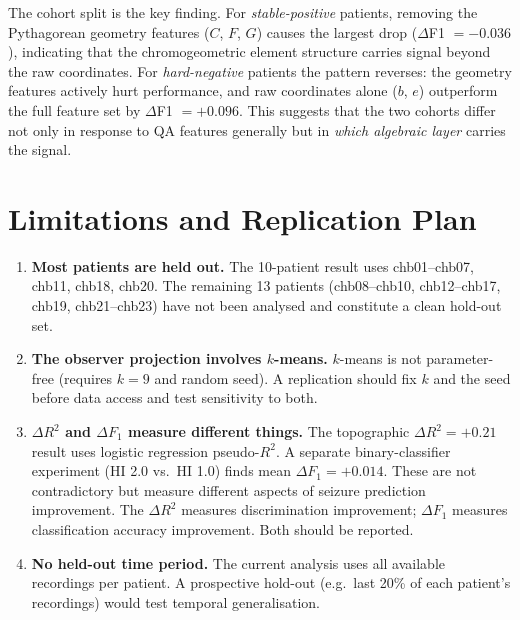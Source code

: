 \documentclass[11pt]{article}
\begin{document}
The cohort split is the key finding.
For \emph{stable-positive} patients, removing the Pythagorean geometry features ($C$, $F$, $G$)
causes the largest drop ($\Delta$F1 $= -0.036$), indicating that the chromogeometric
element structure carries signal beyond the raw coordinates.
For \emph{hard-negative} patients the pattern reverses: the geometry features actively
hurt performance, and raw coordinates alone ($b$, $e$) outperform the full feature set
by $\Delta$F1 $= +0.096$.
This suggests that the two cohorts differ not only in response to QA features generally
but in \emph{which algebraic layer} carries the signal.

\section{Limitations and Replication Plan}\label{sec:limits}

\begin{enumerate}[label=(\arabic*)]
  \item \textbf{Most patients are held out.}
        The 10-patient result uses chb01--chb07, chb11, chb18, chb20.
        The remaining 13 patients (chb08--chb10, chb12--chb17, chb19, chb21--chb23)
        have not been analysed and constitute a clean hold-out set.

  \item \textbf{The observer projection involves $k$-means.}
        $k$-means is not parameter-free (requires $k=9$ and random seed).
        A replication should fix $k$ and the seed before data access
        and test sensitivity to both.

  \item \textbf{$\Delta R^2$ and $\Delta F_1$ measure different things.}
        The topographic $\Delta R^2 = +0.21$ result uses logistic regression
        pseudo-$R^2$.  A separate binary-classifier experiment (HI 2.0 vs.\ HI 1.0)
        finds mean $\Delta F_1 = +0.014$.  These are not contradictory
        but measure different aspects of seizure prediction improvement.
        The $\Delta R^2$ measures discrimination improvement;
        $\Delta F_1$ measures classification accuracy improvement.
        Both should be reported.

  \item \textbf{No held-out time period.}
        The current analysis uses all available recordings per patient.
        A prospective hold-out (e.g.\ last 20\% of each patient's recordings)
        would test temporal generalisation.
\end{enumerate}
\end{document}
